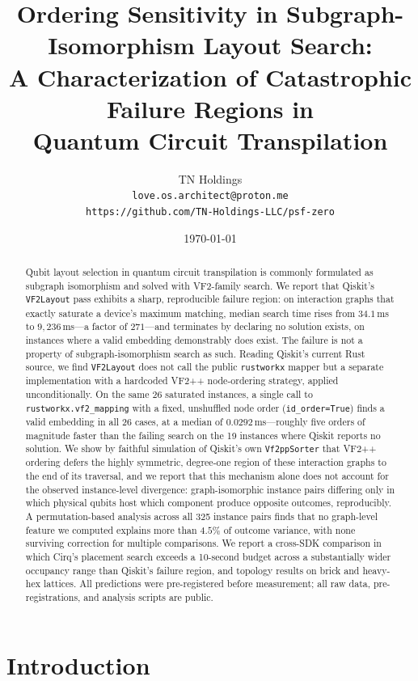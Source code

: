\documentclass[11pt]{article}
\title{Ordering Sensitivity in Subgraph-Isomorphism Layout Search:\\
A Characterization of Catastrophic Failure Regions in\\
Quantum Circuit Transpilation}
\author{TN Holdings\\
\texttt{love.os.architect@proton.me}\\
\texttt{https://github.com/TN-Holdings-LLC/psf-zero}}
\date{\today}
\begin{document}
\maketitle

\begin{abstract}
Qubit layout selection in quantum circuit transpilation is commonly
formulated as subgraph isomorphism and solved with VF2-family search.
We report that Qiskit's \texttt{VF2Layout} pass exhibits a sharp,
reproducible failure region: on interaction graphs that exactly
saturate a device's maximum matching, median search time rises from
$34.1$\,ms to $9{,}236$\,ms---a factor of $271$---and terminates by
declaring no solution exists, on instances where a valid embedding
demonstrably does exist. The failure is not a property of
subgraph-isomorphism search as such. Reading Qiskit's current Rust
source, we find \texttt{VF2Layout} does not call the public
\texttt{rustworkx} mapper but a separate implementation with a
hardcoded VF2++ node-ordering strategy, applied unconditionally. On
the same 26 saturated instances, a single call to
\texttt{rustworkx.vf2\_mapping} with a fixed, unshuffled node order
(\texttt{id\_order=True}) finds a valid embedding in all 26 cases, at a
median of $0.0292$\,ms---roughly five orders of magnitude faster than
the failing search on the 19 instances where Qiskit reports no
solution. We show by faithful simulation of Qiskit's own
\texttt{Vf2ppSorter} that VF2++ ordering defers the highly symmetric,
degree-one region of these interaction graphs to the end of its
traversal, and we report that this mechanism alone does not account for
the observed instance-level divergence: graph-isomorphic instance pairs
differing only in which physical qubits host which component produce
opposite outcomes, reproducibly. A permutation-based analysis across
all 325 instance pairs finds that no graph-level feature we computed
explains more than $4.5\%$ of outcome variance, with none surviving
correction for multiple comparisons. We report a cross-SDK comparison
in which Cirq's placement search exceeds a 10-second budget across a
substantially wider occupancy range than Qiskit's failure region, and
topology results on brick and heavy-hex lattices. All predictions were
pre-registered before measurement; all raw data, pre-registrations, and
analysis scripts are public.
\end{abstract}

\section{Introduction}
\end{document}
